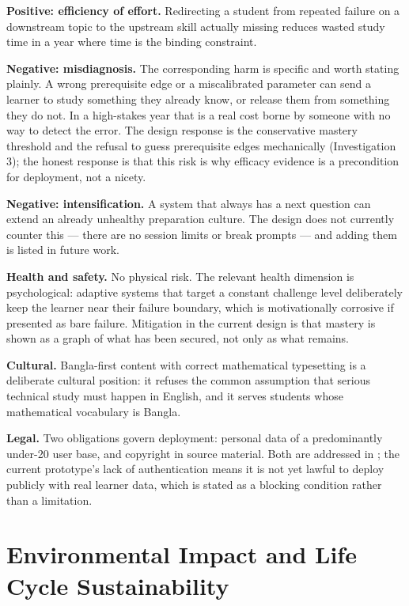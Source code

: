 \textbf{Positive: efficiency of effort.} Redirecting a student from repeated
failure on a downstream topic to the upstream skill actually missing reduces
wasted study time in a year where time is the binding constraint.

\textbf{Negative: misdiagnosis.} The corresponding harm is specific and worth
stating plainly. A wrong prerequisite edge or a miscalibrated parameter can send
a learner to study something they already know, or release them from something
they do not. In a high-stakes year that is a real cost borne by someone with no
way to detect the error. The design response is the conservative mastery
threshold and the refusal to guess prerequisite edges mechanically
(Investigation 3); the honest response is that this risk is why efficacy
evidence is a precondition for deployment, not a nicety.

\textbf{Negative: intensification.} A system that always has a next question can
extend an already unhealthy preparation culture. The design does not currently
counter this --- there are no session limits or break prompts --- and adding them
is listed in future work.

\textbf{Health and safety.} No physical risk. The relevant health dimension is
psychological: adaptive systems that target a constant challenge level
deliberately keep the learner near their failure boundary, which is
motivationally corrosive if presented as bare failure. Mitigation in the current
design is that mastery is shown as a graph of what has been secured, not only as
what remains.

\textbf{Cultural.} Bangla-first content with correct mathematical typesetting is
a deliberate cultural position: it refuses the common assumption that serious
technical study must happen in English, and it serves students whose
mathematical vocabulary is Bangla.

\textbf{Legal.} Two obligations govern deployment: personal data of a
predominantly under-20 user base, and copyright in source material. Both are
addressed in ; the current prototype's lack of
authentication means it is not yet lawful to deploy publicly with real learner
data, which is stated as a blocking condition rather than a limitation.

\section{Environmental Impact and Life Cycle Sustainability}
\label{sec:sustainability}

